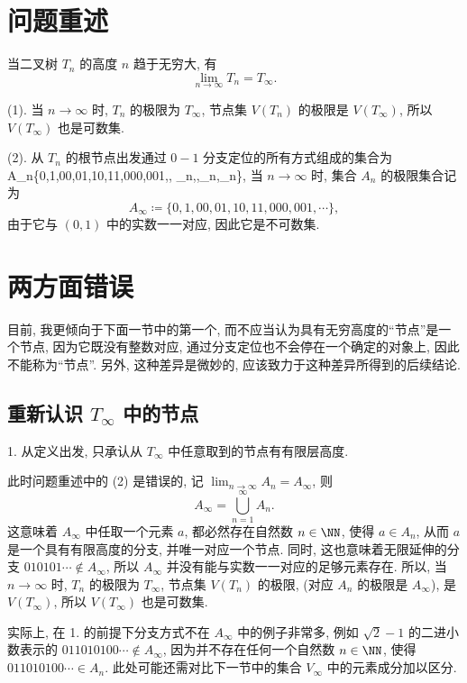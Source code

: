 \section{问题重述}

当二叉树 $T_n$ 的高度 $n$ 趋于无穷大, 有
\[\lim_{n\to \infty}T_n=T_{\infty}.\]

(1). 当 $n\to\infty$ 时, $T_n$ 的极限为 $T_{\infty}$, 节点集 $V(T_n)$ 的极限是 $V(T_\infty)$, 所以 $V(T_{\infty})$ 也是可数集. 

(2). 从 $T_n$ 的根节点出发通过 $0-1$ 分支定位的所有方式组成的集合为
\be\label{eq:1}
A_n\coloneqq\{0,1,00,01,10,11,000,001,\cdots, _{n},\cdots,_{n},_{n}\},
\ee
当 $n\to\infty$ 时, 集合 $A_n$ 的极限集合记为
\[A_{\infty}\coloneqq\{0,1,00,01,10,11,000,001,\cdots\},\]
由于它与 $(0,1)$ 中的实数一一对应, 因此它是不可数集.
\em

\section{两方面错误}

目前, 我更倾向于下面一节中的第一个, 而不应当认为具有无穷高度的``节点''是一个节点, 因为它既没有整数对应, 通过分支定位也不会停在一个确定的对象上, 因此不能称为``节点''. 另外, 这种差异是微妙的, 应该致力于这种差异所得到的后续结论.

\subsection{重新认识 $T_{\infty}$ 中的节点}
1. 从定义出发, 只承认从 $T_{\infty}$ 中任意取到的节点有有限层高度. 

\bm{}{}
此时问题重述中的 (2) 是错误的, 记 $\lim_{n\to\infty}A_n=A_{\infty}$, 则
\[A_{\infty}=\bigcup_{n=1}^{\infty}A_n.\]
这意味着 $A_{\infty}$ 中任取一个元素 $a$, 都必然存在自然数 $n\in\NN$, 使得 $a\in A_n$, 从而 $a$ 是一个具有有限高度的分支, 并唯一对应一个节点. 同时, 这也意味着无限延伸的分支 $010101\cdots\notin A_{\infty}$, 所以 $A_{\infty}$ 并没有能与实数一一对应的足够元素存在.
所以, 当 $n\to\infty$ 时, $T_n$ 的极限为 $T_{\infty}$, 节点集 $V(T_n)$ 的极限, (对应 $A_n$ 的极限是 $A_{\infty}$), 是 $V(T_\infty)$, 所以 $V(T_{\infty})$ 也是可数集. 

实际上, 在 1. 的前提下分支方式不在 $A_{\infty}$ 中的例子非常多, 例如 $\sqrt{2}-1$ 的二进小数表示的 $011010100\cdots\notin A_{\infty}$, 因为并不存在任何一个自然数 $n\in\NN$, 使得 $011010100\cdots\in A_n$. 此处可能还需对比下一节中的集合 $V_{\infty}$ 中的元素成分加以区分.
\em

